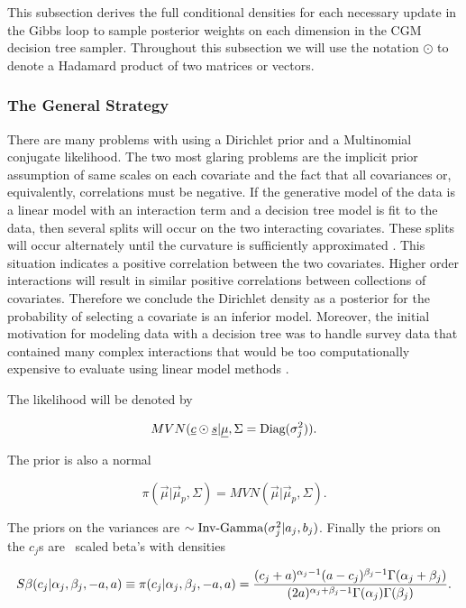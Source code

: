 This subsection derives the full conditional densities for each necessary update in the Gibbs loop to sample posterior weights on each dimension in the CGM decision tree sampler. 
 Throughout this subsection we will use the notation $\odot$ to denote a Hadamard product of two matrices or vectors. 
 
 \subsubsection{The General Strategy}
 There are many problems with using a Dirichlet prior and a Multinomial conjugate likelihood. The two most glaring problems are the implicit prior assumption of same scales on each covariate and the fact that all covariances or, equivalently, correlations must be negative. If the generative model of the data is a linear model with an interaction term and a decision tree model is fit to the data, then several splits will occur on the two interacting covariates. These splits will occur alternately until the curvature is sufficiently approximated \cite{ishwaran2010high}. This situation indicates a positive correlation between the two covariates. Higher order interactions will result in similar positive correlations between collections of covariates. Therefore we conclude the Dirichlet density as a posterior for the probability of selecting a covariate is an inferior model. Moreover, the initial motivation for modeling data with a decision tree was to handle survey data that contained many complex interactions that would be too computationally expensive to evaluate using linear model methods \cite{morgan1963problems}. 
 
 The likelihood will be denoted by
 
 \begin{equation}\newnot{symbol:mvn}
 MVN(\vec{c}\odot\vec{s}\vert \vec{\mu}, \Sigma=\text{Diag}(\sigma^2_j)).
 \end{equation}
 
 The prior is also a normal 
 
 \begin{equation}
 \pi(\vec{\mu}\vert \vec{\mu}_p, \Sigma)=MVN(\vec{\mu}\vert \vec{\mu}_p, \Sigma).
 \end{equation}

The priors on the variances are \iid $\sim \text{Inv-Gamma}({\sigma_j^2}\vert{a_j},{b_j})$.
Finally the priors on the $c_j$s are \iid\ scaled beta's with densities 

\begin{equation}\newnot{symbol:scaled_beta}
S\beta(c_j\vert \alpha_j, \beta_j, -a, a)\equiv\pi(c_j\vert \alpha_j, \beta_j, -a, a)= \frac{(c_j+a)^{\alpha_j-1}(a-c_j)^{\beta_j-1}\Gamma(\alpha_j+\beta_j)}{(2a)^{\alpha_j+\beta_j-1}\Gamma(\alpha_j)\Gamma(\beta_j)}.
\end{equation}

